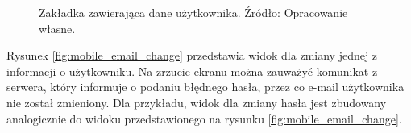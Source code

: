 \documentclass[twoside]{projektInzynierskiMS}
\numberwithin{figure}{section}
\begin{document}
\begin{figure}[h!]
\caption{Zakładka zawierająca dane użytkownika. Źródło: Opracowanie własne.}
\label{fig:mobile_my_data}
\end{figure}
\newpage
Rysunek \ref{fig:mobile_email_change} przedstawia widok dla zmiany jednej z informacji o użytkowniku. Na zrzucie ekranu można zauważyć komunikat z serwera, który informuje o podaniu błędnego hasła, przez co e-mail użytkownika nie został zmieniony. Dla przykładu, widok dla zmiany hasła jest zbudowany analogicznie do widoku przedstawionego na rysunku \ref{fig:mobile_email_change}.
\end{document}
